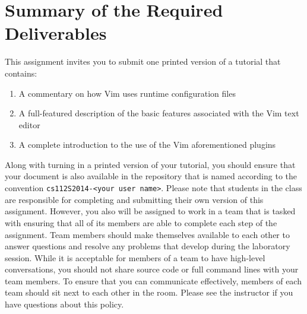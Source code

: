 \section*{Summary of the Required Deliverables}

  This assignment invites you to submit one printed version of a tutorial that contains:

  \begin{enumerate}
    \item A commentary on how Vim uses runtime configuration files
    \item A full-featured description of the basic features associated with the Vim text editor
    \item A complete introduction to the use of the Vim aforementioned plugins 
  \end{enumerate}

  Along with turning in a printed version of your tutorial, you should ensure that your document is also available in the repository
  that is named according to the convention {\tt cs112S2014-<your user name>}. Please note that students in the class are
  responsible for completing and submitting their own version of this assignment.  However, you also will be assigned to work in a
  team that is tasked with ensuring that all of its members are able to complete each step of the assignment.  Team members should
  make themselves available to each other to answer questions and resolve any problems that develop during the laboratory session.
  While it is acceptable for members of a team to have high-level conversations, you should not share source code or full command
  lines with your team members. To ensure that you can communicate effectively, members of each team should sit next to each other
  in the room.  Please see the instructor if you have questions about this policy.

  
